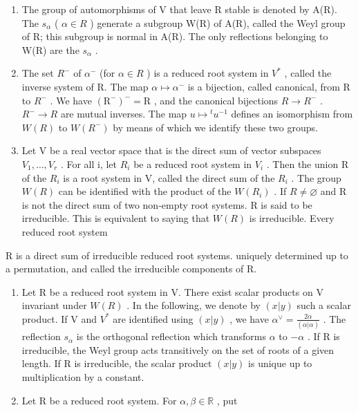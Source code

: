 \begin{enumerate}
\def\labelenumi{\arabic{enumi})}
\setcounter{enumi}{1}
\item
  The group of automorphisms of V that leave R stable is denoted by A(R). The \(s_{\alpha}\) ( \(\alpha \in R\) ) generate a subgroup W(R) of A(R), called the Weyl group of R; this subgroup is normal in A(R). The only reflections belonging to W(R) are the \(s_{\alpha}\) .
\item
  The set \(R^{-}\) of \(\alpha^{-}\) (for \(\alpha \in R\) ) is a reduced root system in \(V^{*}\) , called the inverse system of R. The map \(\alpha \mapsto \alpha^{-}\) is a bijection, called canonical, from R to \(R^{-}\) . We have \((\mathrm{R}^{-})^{-} = \mathrm{R}\) , and the canonical bijections \(R \to R^{-}\) . \(R^{-} \to R\) are mutual inverses. The map \(u \mapsto {}^{t}u^{-1}\) defines an isomorphism from \(W(R)\) to \(W(R^{-})\) by means of which we identify these two groups.
\item
  Let V be a real vector space that is the direct sum of vector subspaces \(V_{1},\ldots,V_{r}\) . For all i, let \(R_{i}\) be a reduced root system in \(V_{i}\) . Then the union R of the \(R_{i}\) is a root system in V, called the direct sum of the \(R_{i}\) . The group \(W(R)\) can be identified with the product of the \(W(R_{i})\) . If \(R \neq \varnothing\) and R is not the direct sum of two non-empty root systems. R is said to be irreducible. This is equivalent to saying that \(W(R)\) is irreducible. Every reduced root system
\end{enumerate}

R is a direct sum of irreducible reduced root systems. uniquely determined up to a permutation, and called the irreducible components of R.

\begin{enumerate}
\def\labelenumi{\arabic{enumi})}
\setcounter{enumi}{4}
\item
  Let R be a reduced root system in V. There exist scalar products on V invariant under \(W(R)\) . In the following, we denote by \((x|y)\) such a scalar product. If V and \(V^{*}\) are identified using \((x|y)\) , we have \(\alpha^{\vee} = \frac{2\alpha}{(\alpha|\alpha)}\) . The reflection \(s_{\alpha}\) is the orthogonal reflection which transforms \(\alpha\) to \(-\alpha\) . If R is irreducible, the Weyl group acts transitively on the set of roots of a given length. If R is irreducible, the scalar product \((x|y)\) is unique up to multiplication by a constant.
\item
  Let R be a reduced root system. For \(\alpha, \beta \in \mathbb{R}\) , put
\end{enumerate}

